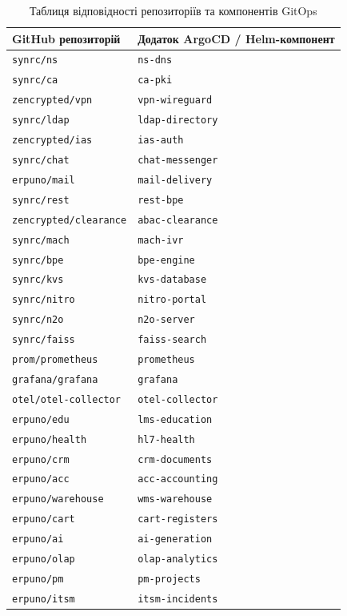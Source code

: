 \documentclass{article}
\begin{document}
\begin{table}[h!]
\small
\begin{tabular}{|l|l|}
\hline
\textbf{GitHub репозиторій} & \textbf{Додаток ArgoCD / Helm-компонент} \\ \hline
\texttt{synrc/ns} & \texttt{ns-dns} \\ \hline
\texttt{synrc/ca} & \texttt{ca-pki} \\ \hline
\texttt{zencrypted/vpn} & \texttt{vpn-wireguard} \\ \hline
\texttt{synrc/ldap} & \texttt{ldap-directory} \\ \hline
\texttt{zencrypted/ias} & \texttt{ias-auth} \\ \hline
\texttt{synrc/chat} & \texttt{chat-messenger} \\ \hline
\texttt{erpuno/mail} & \texttt{mail-delivery} \\ \hline
\texttt{synrc/rest} & \texttt{rest-bpe} \\ \hline
\texttt{zencrypted/clearance} & \texttt{abac-clearance} \\ \hline
\texttt{synrc/mach} & \texttt{mach-ivr} \\ \hline
\texttt{synrc/bpe} & \texttt{bpe-engine} \\ \hline
\texttt{synrc/kvs} & \texttt{kvs-database} \\ \hline
\texttt{synrc/nitro} & \texttt{nitro-portal} \\ \hline
\texttt{synrc/n2o} & \texttt{n2o-server} \\ \hline
\texttt{synrc/faiss} & \texttt{faiss-search} \\ \hline
\texttt{prom/prometheus} & \texttt{prometheus} \\ \hline
\texttt{grafana/grafana} & \texttt{grafana} \\ \hline
\texttt{otel/otel-collector} & \texttt{otel-collector} \\ \hline
\texttt{erpuno/edu} & \texttt{lms-education} \\ \hline
\texttt{erpuno/health} & \texttt{hl7-health} \\ \hline
\texttt{erpuno/crm} & \texttt{crm-documents} \\ \hline
\texttt{erpuno/acc} & \texttt{acc-accounting} \\ \hline
\texttt{erpuno/warehouse} & \texttt{wms-warehouse} \\ \hline
\texttt{erpuno/cart} & \texttt{cart-registers} \\ \hline
\texttt{erpuno/ai} & \texttt{ai-generation} \\ \hline
\texttt{erpuno/olap} & \texttt{olap-analytics} \\ \hline
\texttt{erpuno/pm} & \texttt{pm-projects} \\ \hline
\texttt{erpuno/itsm} & \texttt{itsm-incidents} \\ \hline
\end{tabular}
\caption{Таблиця відповідності репозиторіїв та компонентів GitOps}
\end{table}
\end{document}
